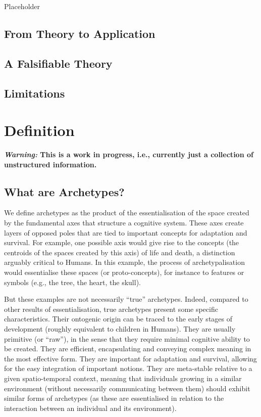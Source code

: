\documentclass[
]{book}
\begin{document}
Placeholder

\hypertarget{from-theory-to-application}{%
\section{From Theory to Application}\label{from-theory-to-application}}

\hypertarget{a-falsifiable-theory}{%
\section{A Falsifiable Theory}\label{a-falsifiable-theory}}

\hypertarget{limitations}{%
\section{Limitations}\label{limitations}}

\hypertarget{definition}{%
\chapter{Definition}\label{definition}}

\textbf{\emph{Warning:} This is a work in progress, i.e., currently just a collection of unstructured information.}

\hypertarget{what-are-archetypes}{%
\section{What are Archetypes?}\label{what-are-archetypes}}

We define archetypes as the product of the essentialisation of the space created by the fundamental axes that structure a cognitive system. These axes create layers of opposed poles that are tied to important concepts for adaptation and survival. For example, one possible axis would give rise to the concepts (the centroids of the spaces created by this axis) of life and death, a distinction arguably critical to Humans. In this example, the process of archetypalisation would essentialise these spaces (or proto-concepts), for instance to features or symbols (e.g., the tree, the heart, the skull).

But these examples are not necessarily ``true'' archetypes. Indeed, compared to other results of essentialisation, true archetypes present some specific characteristics. Their ontogenic origin can be traced to the early stages of development (roughly equivalent to children in Humans). They are usually primitive (or ``raw''), in the sense that they require minimal cognitive ability to be created. They are efficient, encapsulating and conveying complex meaning in the most effective form. They are important for adaptation and survival, allowing for the easy integration of important notions. They are meta-stable relative to a given spatio-temporal context, meaning that individuals growing in a similar environment (without necessarily communicating between them) should exhibit similar forms of archetypes (as these are essentialised in relation to the interaction between an individual and its environment).
\end{document}
